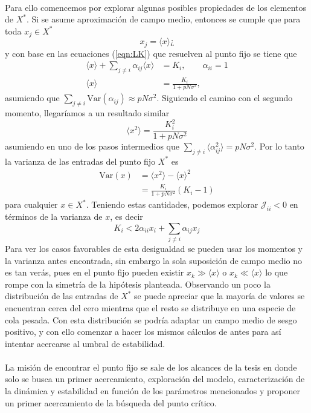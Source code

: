 \documentclass[11pt,a4paper]{article}
\theoremstyle{plain}
\theoremstyle{definition}
\newcommand{\Var}{\mathrm{Var}}
\begin{document}
\\
Para ello comencemos por explorar algunas posibles propiedades de los elementos de $X^*$. Si se asume aproximación de campo medio, entonces se cumple que para toda $x_j\in X^*$
$$x_j=\langle x\rangle¿$$
y con base en las ecuaciones (\ref{eqn:LK}) que resuelven al punto fijo se tiene que
\begin{equation}\label{eqn:1momento}
	\begin{split}
		\langle x\rangle+\sum_{j\neq i}\alpha_{ij}\langle x\rangle&=K_i,\qquad\alpha_{ii}=1\\
		\langle x\rangle&=\frac{K_i}{1+pN\sigma^2},\qquad 
	\end{split}
\end{equation}
asumiendo que $\sum_{j\neq i}\Var(\alpha_{ij})\approx pN\sigma^2$. Siguiendo el camino con el segundo momento, llegaríamos a un resultado similar
\begin{equation}\label{eqn:2momento}
	\langle x^2\rangle=\frac{K_i^2}{1+pN\sigma^2}
\end{equation}
asumiendo en uno de los pasos intermedios que $\sum_{j\neq i}\langle \alpha_{ij}^2\rangle=pN\sigma^2$. Por lo tanto la varianza de las entradas del punto fijo $X^*$ es
\begin{equation}\label{eqn:varianza}
	\begin{split}
		\Var(x) &=\langle x^2\rangle-\langle x\rangle^2\\
		&=\frac{K_i}{1+pN\sigma^2}\left (K_i-1\right )
	\end{split} 
\end{equation}
para cualquier $x\in X^*$. Teniendo estas cantidades, podemos explorar $\mathcal{J}_{ii}<0$ en términos de la varianza de $x$, es decir
$$K_i<2\alpha_{ii}x_i+\sum_{j\neq i}\alpha_{ij}x_j$$
Para ver los casos favorables de esta desigualdad se pueden usar los momentos y la varianza antes encontrada, sin embargo la sola suposición de campo medio no es tan verás, pues en el punto fijo pueden existir $x_k\gg \langle x\rangle$ o $x_k\ll \langle x\rangle$ lo que rompe con la simetría de la hipótesis planteada. Observando un poco la distribución de las entradas de $X^*$ se puede apreciar que la mayoría de valores se encuentran cerca del cero mientras que el resto se distribuye en una especie de cola pesada. Con esta distribución se podría adaptar un campo medio de sesgo positivo, y con ello comenzar a hacer los mismos cálculos de antes para así intentar acercarse al umbral de estabilidad.
\\
\\
La misión de encontrar el punto fijo se sale de los alcances de la tesis en donde solo se busca un primer acercamiento, exploración del modelo, caracterización de la dinámica y estabilidad en función de los parámetros mencionados y proponer un primer acercamiento de la búsqueda del punto crítico.
\end{document}
